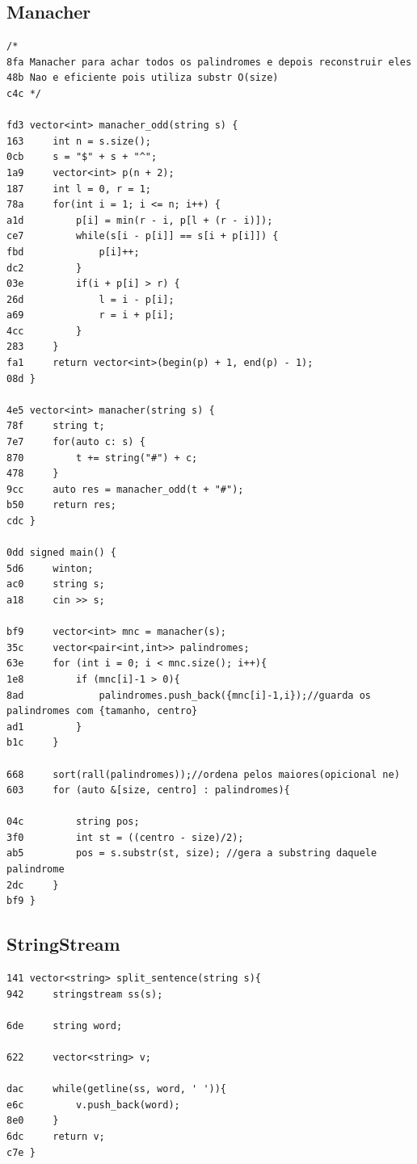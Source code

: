 \documentclass[11pt, a4paper, twoside]{article}
\begin{document}
\subsection{Manacher}
\begin{lstlisting}
/*
8fa Manacher para achar todos os palindromes e depois reconstruir eles
48b Nao e eficiente pois utiliza substr O(size)
c4c */

fd3 vector<int> manacher_odd(string s) {
163     int n = s.size();
0cb     s = "$" + s + "^";
1a9     vector<int> p(n + 2);
187     int l = 0, r = 1;
78a     for(int i = 1; i <= n; i++) {
a1d         p[i] = min(r - i, p[l + (r - i)]);
ce7         while(s[i - p[i]] == s[i + p[i]]) {
fbd             p[i]++;
dc2         }
03e         if(i + p[i] > r) {
26d             l = i - p[i];
a69             r = i + p[i];
4cc         }
283     }
fa1     return vector<int>(begin(p) + 1, end(p) - 1);
08d }

4e5 vector<int> manacher(string s) {
78f     string t;
7e7     for(auto c: s) {
870         t += string("#") + c;
478     }
9cc     auto res = manacher_odd(t + "#");
b50     return res;
cdc }

0dd signed main() {
5d6     winton;
ac0     string s;
a18     cin >> s;
    
bf9     vector<int> mnc = manacher(s);
35c     vector<pair<int,int>> palindromes;
63e     for (int i = 0; i < mnc.size(); i++){
1e8         if (mnc[i]-1 > 0){
8ad             palindromes.push_back({mnc[i]-1,i});//guarda os palindromes com {tamanho, centro}
ad1         }
b1c     }
    
668     sort(rall(palindromes));//ordena pelos maiores(opicional ne)
603     for (auto &[size, centro] : palindromes){
    
04c         string pos;
3f0         int st = ((centro - size)/2);
ab5         pos = s.substr(st, size); //gera a substring daquele palindrome
2dc     }
bf9 }
\end{lstlisting}

\subsection{StringStream}
\begin{lstlisting}
141 vector<string> split_sentence(string s){
942     stringstream ss(s);
    
6de     string word;
    
622     vector<string> v;
    
dac     while(getline(ss, word, ' ')){
e6c         v.push_back(word);
8e0     }
6dc     return v;
c7e }
\end{lstlisting}
\end{document}
